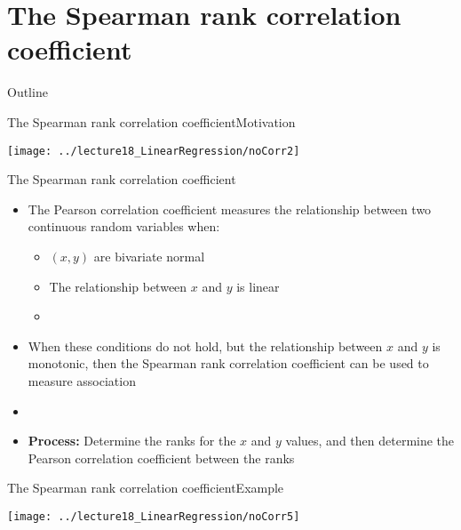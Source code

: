\documentclass[xcolor=dvipsnames]{beamer}
\begin{document}
\section{The Spearman rank correlation coefficient}
\begin{frame}{Outline}
	\tableofcontents[currentsection,subsectionstyle=show/shaded/hide]
\end{frame}

\begin{frame}{The Spearman rank correlation coefficient}{Motivation}
	\begin{center}
		\texttt{[image: ../lecture18\_LinearRegression/noCorr2]}
	\end{center}
\end{frame}

\begin{frame}{The Spearman rank correlation coefficient}
	\begin{itemize}
		\item The Pearson correlation coefficient measures the relationship between two continuous random variables when:
		\begin{itemize}
			\item $(x,y)$ are bivariate normal
			\item The relationship between $x$ and $y$ is linear
			\item[]
		\end{itemize}
		\item When these conditions do not hold, but the relationship between $x$ and $y$ is monotonic, then the Spearman rank correlation coefficient can be used to measure association
		\item[]
		\item \textbf{Process:} Determine the ranks for the $x$ and $y$ values, and then determine the Pearson correlation coefficient between the ranks
	\end{itemize}
\end{frame}

\begin{frame}{The Spearman rank correlation coefficient}{Example}
	\begin{center}
		\texttt{[image: ../lecture18\_LinearRegression/noCorr5]}
	\end{center}
\end{frame}
\end{document}
